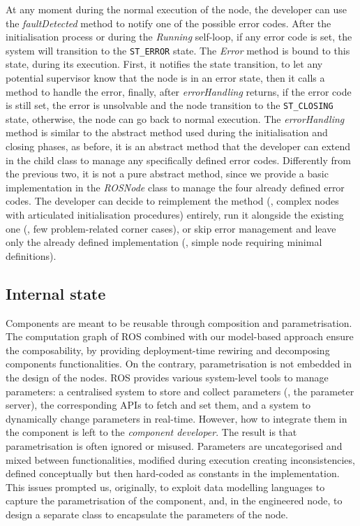 At any moment during the normal execution of the node, the developer can use the \textit{faultDetected} method to notify one of the possible error codes. After the initialisation process or during the \textit{Running} self-loop, if any error code is set, the system will transition to the  \texttt{ST\_ERROR} state. The \textit{Error} method is bound to this state, during its execution. First, it notifies the state transition, to let any potential supervisor know that the node is in an error state, then it calls a method to handle the error, finally, after \textit{errorHandling} returns, if the error code is still set, the error is unsolvable and the node transition to the \texttt{ST\_CLOSING} state, otherwise, the node can go back to normal execution. The \textit{errorHandling} method is similar to the abstract method used during the initialisation and closing phases, as before, it is an abstract method that the developer can extend in the child class to manage any specifically defined error codes. Differently from the previous two, it is not a pure abstract method, since we provide a basic implementation in the \textit{ROSNode} class to manage the four already defined error codes. The developer can decide to reimplement the method (\eg, complex nodes with articulated initialisation procedures) entirely, run it alongside the existing one (\eg, few problem-related corner cases), or skip error management and leave only the already defined implementation (\eg, simple node requiring minimal definitions).

\subsection{Internal state}
Components are meant to be reusable through composition and parametrisation. The computation graph of ROS combined with our model-based approach ensure the composability, by providing deployment-time rewiring and decomposing components functionalities. On the contrary, parametrisation is not embedded in the design of the nodes. ROS provides various system-level tools to manage parameters: a centralised system to store and collect parameters (\ie, the parameter server), the corresponding APIs to fetch and set them, and a system to dynamically change parameters in real-time. However, how to integrate them in the component is left to the \textit{component developer}. The result is that parametrisation is often ignored or misused. Parameters are uncategorised and mixed between functionalities, modified during execution creating inconsistencies, defined conceptually but then hard-coded as constants in the implementation. This issues prompted us, originally, to exploit data modelling languages to capture the parametrisation of the component, and, in the engineered node, to design a separate class to encapsulate the parameters of the node.

